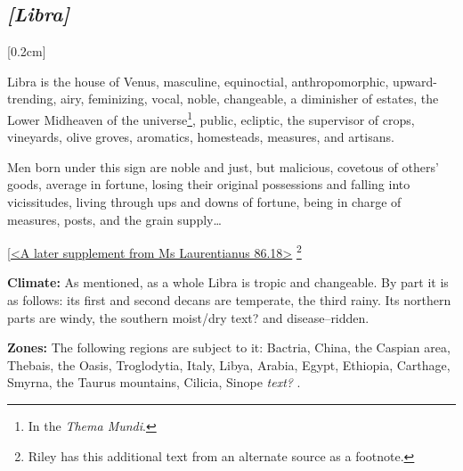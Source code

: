 \secbr
\subsection{\textit{[Libra]}}
[0.2cm]

 Libra is the house of Venus,  masculine,  equinoctial,  anthropomorphic, upward-trending,  airy, feminizing,  vocal, noble, changeable, a diminisher of estates, the Lower Midheaven of the universe\footnote{In the \textit{Thema Mundi}.}, public, ecliptic, the supervisor of crops, vineyards, olive groves, aromatics, homesteads, measures, and artisans.

Men born under this sign are noble and just, but malicious, covetous of others’ goods, average in fortune, losing their original possessions and falling into vicissitudes, living through ups and downs of fortune, being in charge of measures, posts, and the grain supply\ldots

\noindent
[\underline{<A later supplement from Ms Laurentianus 86.18>}
\footnote{Riley has this additional text from an alternate source as a footnote.}  

\textbf{Climate:} As mentioned, as a whole Libra is tropic and changeable. By part it is as follows: its first and second decans are temperate, the third rainy. Its northern
parts are windy, the southern moist/dry text? and disease–ridden. 

\textbf{Zones:} The following regions are subject to it:
Bactria, China, the Caspian area, Thebais, the Oasis, Troglodytia, Italy, Libya, Arabia, Egypt, Ethiopia, Carthage, Smyrna, the Taurus mountains, Cilicia, Sinope \textit{text?} . 

